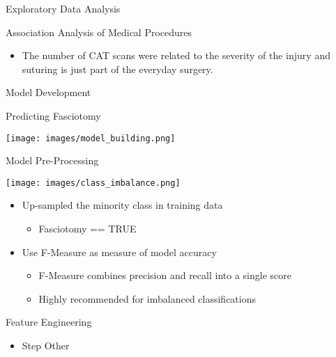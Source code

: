 \documentclass[
  ignorenonframetext,
]{beamer}
\providecommand{\tightlist}{%
  \setlength{\itemsep}{0pt}\setlength{\parskip}{0pt}}
\begin{document}
\begin{frame}{Exploratory Data Analysis}
\begin{block}{Association Analysis of Medical Procedures}
\begin{itemize}
  \begin{itemize}
  \tightlist
  \item
    The number of CAT scans were related to the severity of the injury
    and suturing is just part of the everyday surgery.
  \end{itemize}
\end{itemize}

\end{block}

\end{frame}

\begin{frame}{Model Development}
\protect\hypertarget{model-development}{}

\begin{block}{Predicting Fasciotomy}

\texttt{[image: images/model\_building.png]}

\end{block}

\begin{block}{Model Pre-Processing}

\texttt{[image: images/class\_imbalance.png]}

\begin{itemize}
\tightlist
\item
  Up-sampled the minority class in training data

  \begin{itemize}
  \tightlist
  \item
    Fasciotomy == TRUE
  \end{itemize}
\item
  Use F-Measure as measure of model accuracy

  \begin{itemize}
  \tightlist
  \item
    F-Measure combines precision and recall into a single score
  \item
    Highly recommended for imbalanced classifications
  \end{itemize}
\end{itemize}

\end{block}

\begin{block}{Feature Engineering}

\begin{itemize}
\tightlist
\item
  Step Other


\end{itemize}
\end{block}
\end{frame}
\end{document}
